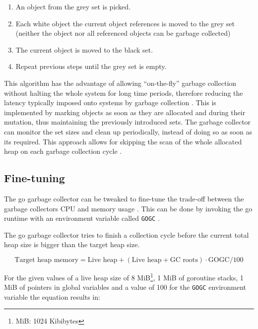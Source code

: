 \begin{enumerate}
    \item An object from the grey set is picked.
    \item Each white object the current object references is moved to the grey
        set (neither the object nor all referenced objects can be garbage
        collected) 
    \item The current object is moved to the black set.
    \item Repeat previous steps until the grey set is empty.
\end{enumerate}

This algorithm has the advantage of allowing ``on-the-fly'' garbage collection
without halting the whole system for long time periods, therefore reducing the
latency typically imposed onto systems by garbage collection
\cite[Abstract]{dijkstra-gc-1978}. This is implemented by marking objects as
soon as they are allocated and during their mutation, thus maintaining the
previously introduced sets. The garbage collector can monitor the set sizes and
clean up periodically, instead of doing so as soon as its required. This
approach allows for skipping the scan of the whole allocated heap on each
garbage collection cycle \cite[6. A Fine-Grained Solution]{dijkstra-gc-1978}.

\subsection{Fine-tuning}

The go garbage collector can be tweaked to fine-tune the trade-off between the
garbage collectors CPU and memory usage \cite[The GC
cycle]{go_gcguide_2022}. This can be done by invoking the go runtime with an
environment variable called \texttt{GOGC} \cite[GOGC]{go_gcguide_2022}.

The go garbage collector tries to finish a collection cycle before the current
total heap size is bigger than the target heap size.

\begin{equation}
    \textrm{Target heap memory} = \textrm{Live heap} + \left(\textrm{Live heap} + \textrm{GC roots}\right) \cdot \textrm{GOGC} / 100
\end{equation}

For the given values of a live heap size of 8 MiB\footnote{MiB: 1024 Kibibytes}, 1 MiB of goroutine stacks,
1 MiB of pointers in global variables and a value of 100 for the \texttt{GOGC}
environment variable the equation results in:

